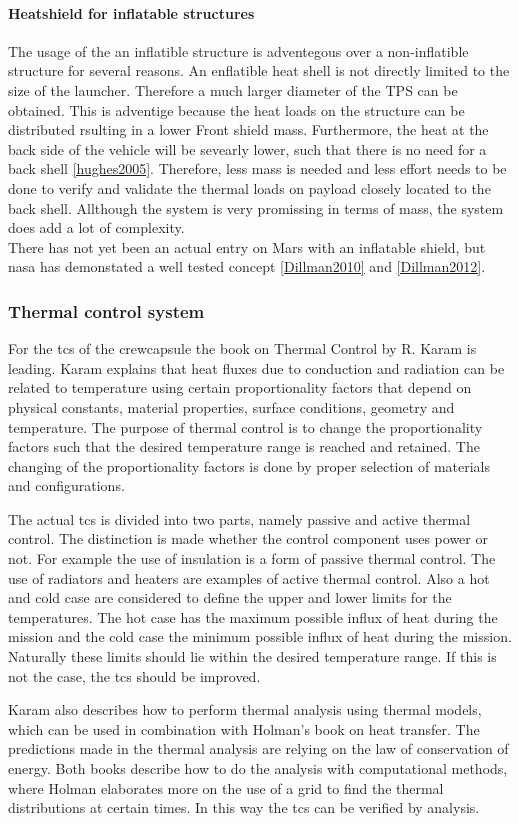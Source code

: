 \paragraph{Heatshield for inflatable structures}
The usage of the an inflatible structure is adventegous over a non-inflatible structure for several reasons. An enflatible heat shell is not directly limited to the size of the launcher. Therefore a much larger diameter of the TPS can be obtained. This is adventige because the heat loads on the structure can be distributed rsulting in a lower Front shield mass. Furthermore, the heat at the back side of the vehicle will be sevearly lower, such that there is no need for a back shell \ref{hughes2005}. Therefore, less mass is needed and less effort needs to be done to verify and validate the thermal loads on payload closely located to the back shell. Allthough the system is very promissing in terms of mass, the system does add a lot of complexity.\\

There has not yet been an actual entry on Mars with an inflatable shield, but nasa has demonstated a well tested concept \ref{Dillman2010} and \ref{Dillman2012}.


\subsubsection{Thermal control system}
For the \gls{tcs} of the crewcapsule the book on Thermal Control by R. Karam is leading. \cite{Karam1998} Karam explains that heat fluxes due to conduction and radiation can be related to temperature using certain proportionality factors that depend on physical constants, material properties, surface conditions, geometry and temperature. The purpose of thermal control is to change the proportionality factors such that the desired temperature range is reached and retained. The changing of the proportionality factors is done by proper selection of materials and configurations.

The actual \gls{tcs} is divided into two parts, namely passive and active thermal control. The distinction is made whether the control component uses power or not. For example the use of insulation is a form of passive thermal control. The use of radiators and heaters are examples of active thermal control. Also a hot and cold case are considered to define the upper and lower limits for the temperatures. The hot case has the maximum possible influx of heat during the mission and the cold case the minimum possible influx of heat during the mission. Naturally these limits should lie within the desired temperature range. If this is not the case, the \gls{tcs} should be improved.

Karam also describes how to perform thermal analysis using thermal models, which can be used in combination with Holman's book on heat transfer. \cite{Holman2002} The predictions made in the thermal analysis are relying on the law of conservation of energy. Both books describe how to do the analysis with computational methods, where Holman elaborates more on the use of a grid to find the thermal distributions at certain times. In this way the \gls{tcs} can be verified by analysis.




